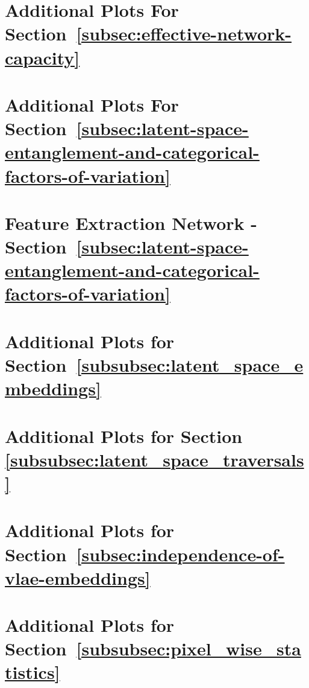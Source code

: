 \documentclass[11pt,a4paper]{article}
\let\oldsection\section
\renewcommand\section{\clearpage\oldsection}
\begin{document}
\pagebreak
\section{Additional Plots For Section~\ref{subsec:effective-network-capacity}}\label{sec:additional_plots_sparseness}


\pagebreak
\section{Additional Plots For Section~\ref{subsec:latent-space-entanglement-and-categorical-factors-of-variation}}\label{sec:additional_plots_latent_space_entanglement}


\pagebreak
\section{Feature Extraction Network - Section~\ref{subsec:latent-space-entanglement-and-categorical-factors-of-variation}}\label{sec:appendix_feature_extraction_network_ppl_dsprites}


\pagebreak
\section{Additional Plots for Section~\ref{subsubsec:latent_space_embeddings}}\label{sec:appendix_latent_space_embeddings}


\pagebreak
\section{Additional Plots for Section \ref{subsubsec:latent_space_traversals}}\label{sec:appendix_plots_latent_space_traversals}


\pagebreak
\section{Additional Plots for Section~\ref{subsec:independence-of-vlae-embeddings}}\label{sec:additional-plots-for-section_independence}


\pagebreak
\section{Additional Plots for Section~\ref{subsubsec:pixel_wise_statistics}}\label{sec:appendix_pixel_wise_statistics}

\end{document}
